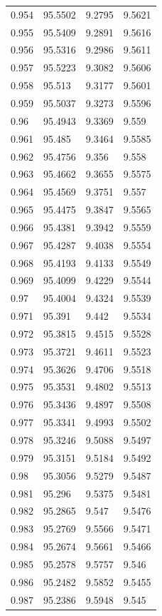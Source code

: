 \begin{tabular}{llll}
0.954 & 95.5502 & 9.2795 & 9.5621 \\
0.955 & 95.5409 & 9.2891 & 9.5616 \\
0.956 & 95.5316 & 9.2986 & 9.5611 \\
0.957 & 95.5223 & 9.3082 & 9.5606 \\
0.958 & 95.513 & 9.3177 & 9.5601 \\
0.959 & 95.5037 & 9.3273 & 9.5596 \\
0.96 & 95.4943 & 9.3369 & 9.559 \\
0.961 & 95.485 & 9.3464 & 9.5585 \\
0.962 & 95.4756 & 9.356 & 9.558 \\
0.963 & 95.4662 & 9.3655 & 9.5575 \\
0.964 & 95.4569 & 9.3751 & 9.557 \\
0.965 & 95.4475 & 9.3847 & 9.5565 \\
0.966 & 95.4381 & 9.3942 & 9.5559 \\
0.967 & 95.4287 & 9.4038 & 9.5554 \\
0.968 & 95.4193 & 9.4133 & 9.5549 \\
0.969 & 95.4099 & 9.4229 & 9.5544 \\
0.97 & 95.4004 & 9.4324 & 9.5539 \\
0.971 & 95.391 & 9.442 & 9.5534 \\
0.972 & 95.3815 & 9.4515 & 9.5528 \\
0.973 & 95.3721 & 9.4611 & 9.5523 \\
0.974 & 95.3626 & 9.4706 & 9.5518 \\
0.975 & 95.3531 & 9.4802 & 9.5513 \\
0.976 & 95.3436 & 9.4897 & 9.5508 \\
0.977 & 95.3341 & 9.4993 & 9.5502 \\
0.978 & 95.3246 & 9.5088 & 9.5497 \\
0.979 & 95.3151 & 9.5184 & 9.5492 \\
0.98 & 95.3056 & 9.5279 & 9.5487 \\
0.981 & 95.296 & 9.5375 & 9.5481 \\
0.982 & 95.2865 & 9.547 & 9.5476 \\
0.983 & 95.2769 & 9.5566 & 9.5471 \\
0.984 & 95.2674 & 9.5661 & 9.5466 \\
0.985 & 95.2578 & 9.5757 & 9.546 \\
0.986 & 95.2482 & 9.5852 & 9.5455 \\
0.987 & 95.2386 & 9.5948 & 9.545 \\

\end{tabular}
